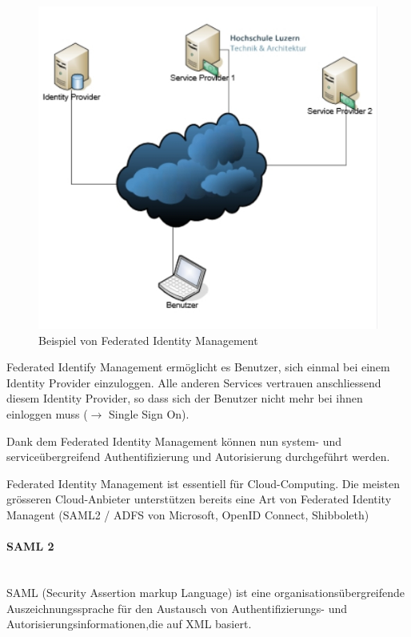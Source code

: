 \documentclass[a4paper, 11pt]{article}
\begin{document}
\begin{figure}
	\centering
	\includegraphics[keepaspectratio=true,height=15\baselineskip]{fim.jpg}
	\caption{Beispiel von Federated Identity Management}
	\label{fig:fim}
\end{figure}

Federated Identify Management ermöglicht es Benutzer, sich einmal bei einem Identity Provider einzuloggen. Alle anderen Services vertrauen anschliessend diesem Identity Provider, so dass sich der Benutzer nicht mehr bei ihnen einloggen muss ($\rightarrow$ Single Sign On).

Dank dem Federated Identity Management können nun system- und serviceübergreifend Authentifizierung und Autorisierung durchgeführt werden.

\vspace{10px}

\noindent Federated Identity Management ist essentiell für Cloud-Computing. Die meisten grösseren Cloud-Anbieter unterstützen bereits eine Art von Federated Identity Managent (SAML2 / ADFS von Microsoft, OpenID Connect, Shibboleth)

\paragraph{SAML 2}\mbox{}\\
SAML (Security Assertion markup Language) ist eine organisationsübergreifende Auszeichnungssprache für den Austausch von Authentifizierungs- und Autorisierungsinformationen,die auf XML basiert. 
\end{document}
